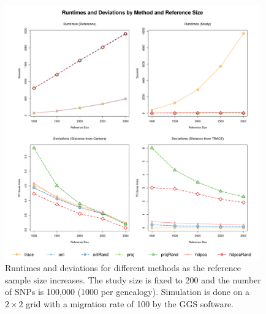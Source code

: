\documentclass{article}
\begin{document}
\begin{figure}[p]
  \centering
  \includegraphics[width=0.98\textwidth]{nChg}
  \caption{
    Runtimes and deviations for different methods as the reference sample size increases.
    The study size is fixed to 200 and the number of SNPs is 100,000 (1000 per genealogy). 
    Simulation is done on a $2 \times 2$ grid with a migration rate of 100 by the GGS software. 
  }
  \label{fig:nChg}
\end{figure}
\end{document}
